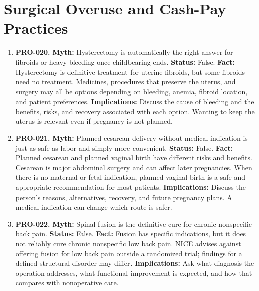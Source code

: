 \documentclass[11pt,oneside]{book}
\begin{document}
\section{Surgical Overuse and Cash-Pay Practices}
\begin{enumerate}[leftmargin=0pt,labelwidth=0pt,labelsep=0pt,itemindent=0pt]
\item[] \textbf{PRO-020.} \textbf{Myth:} Hysterectomy is automatically the right answer for fibroids or heavy bleeding once childbearing ends.\newline
\textbf{Status:} False.\newline
\textbf{Fact:} Hysterectomy is definitive treatment for uterine fibroids, but some fibroids need no treatment. Medicines, procedures that preserve the uterus, and surgery may all be options depending on bleeding, anemia, fibroid location, and patient preferences. \cite{ref496,ref170}\newline
\textbf{Implications:} Discuss the cause of bleeding and the benefits, risks, and recovery associated with each option. Wanting to keep the uterus is relevant even if pregnancy is not planned.
\item[] \textbf{PRO-021.} \textbf{Myth:} Planned cesarean delivery without medical indication is just as safe as labor and simply more convenient.\newline
\textbf{Status:} False.\newline
\textbf{Fact:} Planned cesarean and planned vaginal birth have different risks and benefits. Cesarean is major abdominal surgery and can affect later pregnancies. When there is no maternal or fetal indication, planned vaginal birth is a safe and appropriate recommendation for most patients. \cite{ref497}\newline
\textbf{Implications:} Discuss the person's reasons, alternatives, recovery, and future pregnancy plans. A medical indication can change which route is safer.
\item[] \textbf{PRO-022.} \textbf{Myth:} Spinal fusion is the definitive cure for chronic nonspecific back pain.\newline
\textbf{Status:} False.\newline
\textbf{Fact:} Fusion has specific indications, but it does not reliably cure chronic nonspecific low back pain. NICE advises against offering fusion for low back pain outside a randomized trial; findings for a defined structural disorder may differ. \cite{ref498}\newline
\textbf{Implications:} Ask what diagnosis the operation addresses, what functional improvement is expected, and how that compares with nonoperative care.

\end{enumerate}
\end{document}
